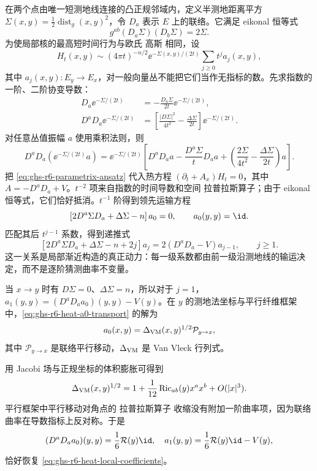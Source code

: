 在两个点由唯一短测地线连接的凸正规邻域内，定义半测地距离平方
$\Sigma(x,y)=\tfrac12\operatorname{dist}_g(x,y)^2$，令 $D_a$ 表示 $E$ 上的联络。它满足 eikonal 恒等式
\[
 g^{ab}(D_a\Sigma)(D_b\Sigma)=2\Sigma.
\]
为使局部核的最高短时间行为与欧氏 高斯 相同，设
\begin{equation}\label{eq:ghs-r6-parametrix-ansatz}
H_t(x,y)\sim (4\pi t)^{-n/2}\ee^{-\Sigma(x,y)/(2t)}
\sum_{j\ge0}t^ja_j(x,y),
\end{equation}
其中 $a_j(x,y):E_y\to E_x$，对一般向量丛不能把它们当作无指标的数。先求指数的一阶、二阶协变导数：
\begin{align*}
D_a\ee^{-\Sigma/(2t)}
&=-\frac{D_a\Sigma}{2t}\ee^{-\Sigma/(2t)},\\
D^aD_a\ee^{-\Sigma/(2t)}
&=\left[\frac{|D\Sigma|^2}{4t^2}
 -\frac{\Delta\Sigma}{2t}\right]\ee^{-\Sigma/(2t)}.
\end{align*}
对任意丛值振幅 $a$ 使用乘积法则，则
\[
D^aD_a(\ee^{-\Sigma/(2t)}a)
=\ee^{-\Sigma/(2t)}\left[D^aD_aa
 -\frac{D^a\Sigma}{t}D_aa
 +\left(\frac{2\Sigma}{4t^2}-\frac{\Delta\Sigma}{2t}\right)a\right].
\]
把 \cref{eq:ghs-r6-parametrix-ansatz} 代入热方程 $(\partial_t+A_x)H_t=0$，其中 $A=-D^aD_a+V$。$t^{-2}$ 项来自指数的时间导数和空间 拉普拉斯算子；由于 eikonal 恒等式，它们恰好抵消。$t^{-1}$ 阶得到领先运输方程
\begin{equation}\label{eq:ghs-r6-heat-a0-transport}
\left[2D^a\Sigma D_a+\Delta\Sigma-n\right]a_0=0,
\qquad a_0(y,y)=\id.
\end{equation}
匹配其后 $t^{j-1}$ 系数，得到递推式
\begin{equation}\label{eq:ghs-r6-heat-aj-transport}
\left[2D^a\Sigma D_a+\Delta\Sigma-n+2j\right]a_j
=2(D^aD_a-V)a_{j-1},\qquad j\ge1.
\end{equation}
这一关系是局部渐近构造的真正动力：每一级系数都由前一级沿测地线的输运决定，而不是逐阶猜测曲率不变量。

当 $x\to y$ 时有 $D\Sigma=0$、$\Delta\Sigma=n$，所以对于 $j=1$，
$a_1(y,y)=(D^aD_aa_0)(y,y)-V(y)$。在 $y$ 的测地法坐标与平行纤维框架中，\cref{eq:ghs-r6-heat-a0-transport} 的解为
\[
a_0(x,y)=\Delta_{\rm VM}(x,y)^{1/2}\mathcal P_{y\to x},
\]
其中 $\mathcal P_{y\to x}$ 是联络平行移动，$\Delta_{\rm VM}$ 是 Van Vleck 行列式。

用 Jacobi 场与正规坐标的体积膨胀可得到
\[
\Delta_{\rm VM}(x,y)^{1/2}
=1+\frac1{12}\operatorname{Ric}_{ab}(y)x^ax^b+O(|x|^3).
\]
平行框架中平行移动对角点的 拉普拉斯算子 收缩没有附加一阶曲率项，因为联络曲率在导数指标上反对称。于是
\[
(D^aD_aa_0)(y,y)=\frac16\mathcal R(y)\id,
\quad a_1(y,y)=\frac16\mathcal R(y)\id-V(y),
\]
恰好恢复 \cref{eq:ghs-r6-heat-local-coefficients}。

